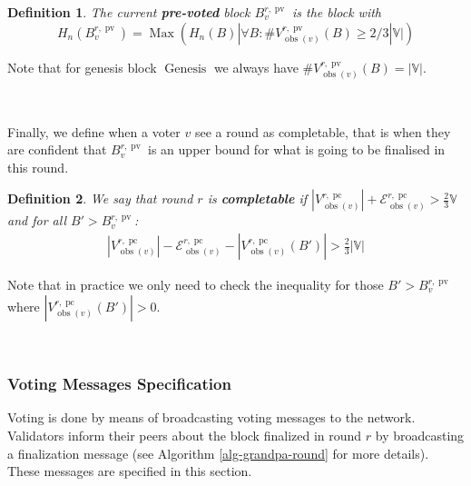 \documentclass{article}
\newcommand{\nosymbol}{}
\newcommand{\tmop}[1]{\ensuremath{\operatorname{#1}}}
\newcommand{\tmstrong}[1]{\textbf{#1}}
\newcommand{\tmtextbf}[1]{{\bfseries{#1}}}
\newtheorem{definition}{Definition}
\providecommand{\nosymbol}{}
\providecommand{\tmop}[1]{\ensuremath{\mathrm{#1}}}
\providecommand{\tmstrong}[1]{\tmtextbf{#1}}
\providecommand{\tmtextbf}[1]{\tmtextbf{#1}}
\newtheorem{definition}{Definition}
\begin{document}
\begin{definition}
  The current {\tmstrong{pre-voted}} block $B^{r, \tmop{pv}}_v$ is the block
  with
  \[ H_n (B^{r, \tmop{pv}}_v) = \tmop{Max} (H_n (B) | \forall B :
     \#V_{\tmop{obs} (v)}^{r, \tmop{pv}} (B) \geqslant 2 / 3|\mathbb{V}|) \]
\end{definition}

Note that for genesis block $\tmop{Genesis}$ we always have $\#V_{\tmop{obs}
(v)}^{r, \tmop{pv}} (B) = | \mathbb{V} |$.

\

Finally, we define when a voter $v$ see a round as completable, that is when
they are confident that $B_v^{r, \tmop{pv}}$ is an upper bound for what is
going to be finalised in this round. \

\begin{definition}
  We say that round $r$ is {\tmstrong{completable}} if $|V^{r,
  \tmop{pc}}_{\tmop{obs} (v)} | +\mathcal{E}^{r, \tmop{pc}}_{\tmop{obs} (v)} >
  \frac{2}{3} \mathbb{V}$ and for all $B' > B_v^{r, \tmop{pv}}$:
  \[ \begin{array}{l}
       |V^{r, \tmop{pc}}_{\tmop{obs} (v)} | -\mathcal{E}^{r,
       \tmop{pc}}_{\tmop{obs} (v)} - |V^{r, \tmop{pc}}_{\tmop{obs}
       (v)_{\nosymbol}} (B') | > \frac{2}{3} |\mathbb{V}|
     \end{array} \]
\end{definition}

Note that in practice we only need to check the inequality for those $B' >
B_v^{r, \tmop{pv}}$ where $|V^{r, \tmop{pc}}_{\tmop{obs} (v)_{\nosymbol}} (B')
| > 0$.

\

\subsubsection{Voting Messages Specification}

Voting is done by means of broadcasting voting messages to the network.
Validators inform their peers about the block finalized in round $r$ by
broadcasting a finalization message (see Algorithm \ref{alg-grandpa-round} for
more details). These messages are specified in this section.
\end{document}
